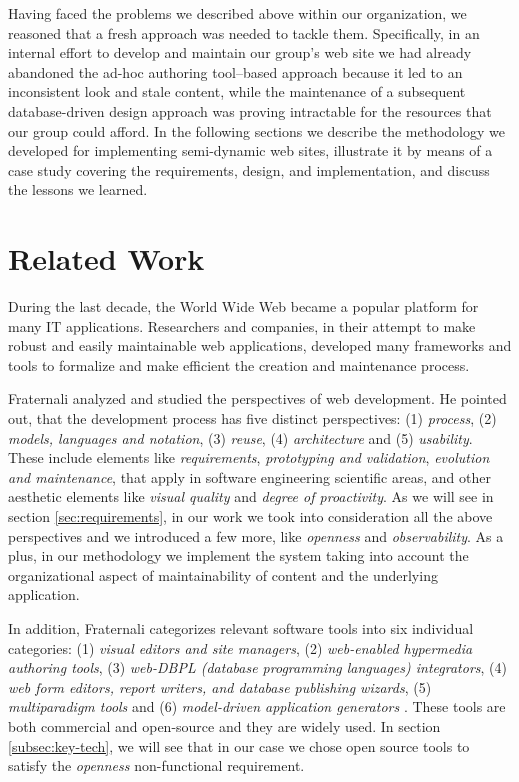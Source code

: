 \documentclass[10pt]{article}
\begin{document}
Having faced the problems we described above within our organization,
we reasoned that a fresh approach was needed to tackle them.
Specifically,
in an internal effort to develop and maintain our group's web site
we had already abandoned the ad-hoc authoring tool--based approach
because it led to an inconsistent look and stale content,
while the maintenance of a subsequent database-driven
design approach was proving intractable for the resources that
our group could afford.
In the following sections we describe the methodology we developed
for implementing semi-dynamic web sites,
illustrate it by means
of a case study covering the requirements, design, and implementation,
and discuss the lessons we learned.

\section{Related Work}
\label{sec:related}

During the last decade, the World Wide Web became a popular platform for many {\sc IT} applications.
Researchers and companies, in their attempt to make robust and easily maintainable web applications,
developed many frameworks and tools to formalize and make efficient the creation and maintenance process.

Fraternali \cite{FRA99} analyzed and studied the perspectives of
web development. He pointed out, that the development process has
five distinct perspectives: (1) {\em process}, (2) {\em models, languages and notation}, (3) {\em reuse}, (4) {\em architecture} and (5) {\em usability}.
These include elements like {\em requirements}, {\em  prototyping and validation}, {\em evolution and maintenance}, that apply in
software engineering scientific areas, and other aesthetic elements like {\em visual quality} and {\em degree of proactivity}.
As we will see in section \ref{sec:requirements}, in our work we took into consideration all the above perspectives and we introduced a few more, like {\em openness}
and {\em observability}.
As a plus, in our methodology we implement the system taking into account the organizational aspect of maintainability of content and the underlying application.

In addition, Fraternali categorizes relevant software tools into six individual categories: (1) {\em visual editors and site managers},
 (2) {\em web-enabled hypermedia authoring tools}, (3) {\em web-DBPL (database programming languages) integrators}, (4) {\em web form editors, report writers,
 and database publishing wizards},
 (5) {\em multiparadigm tools} and (6) {\em model-driven application generators} \cite{FRA99}. These tools are both commercial and open-source and they are widely used.
 In section \ref{subsec:key-tech}, we will see that in our case we chose open source tools to satisfy the {\em openness} non-functional requirement.
 
\end{document}
